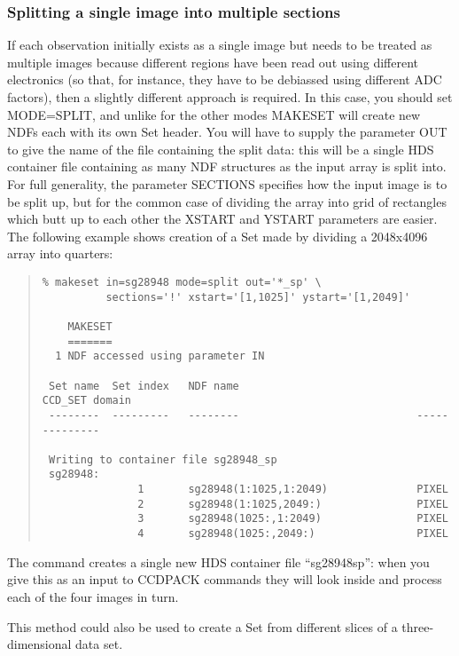 \documentclass[twoside,11pt]{article}
\newcommand{\latexhtml}[2]{#1}
\renewcommand{\_}{\texttt{\symbol{95}}}
\newcommand{\ttsize}{\latexhtml{\small}{}}
\newenvironment{myquote}{\begin{quote}\ttsize}{\end{quote}}
\begin{document}
\subsubsection{\label{makeset_split}Splitting a single image into 
               multiple sections}

If each observation initially exists as a single image 
but needs to be treated as multiple images
because different regions have been read out using different
electronics (so that, for instance, they have to be debiassed using
different ADC factors), then a slightly different approach is required.
In this case, you should set MODE=SPLIT,
and unlike for the other modes MAKESET will create new NDFs each
with its own Set header.  You will have to supply the parameter OUT
to give the name of the file containing the split data:
this will be a single HDS container file containing as many
NDF structures as the input array is split into.
For full generality, the parameter SECTIONS specifies how 
the input image is to be split up, but for the common case of dividing the
array into grid of rectangles which butt up to each other the
XSTART and YSTART parameters are easier.
The following example shows creation of a Set made by dividing 
a 2048x4096 array into quarters:
\begin{myquote}
\begin{verbatim}
% makeset in=sg28948 mode=split out='*_sp' \
          sections='!' xstart='[1,1025]' ystart='[1,2049]'

    MAKESET
    =======
  1 NDF accessed using parameter IN

 Set name  Set index   NDF name                            CCD_SET domain
 --------  ---------   --------                            --------------

 Writing to container file sg28948_sp
 sg28948:
               1       sg28948(1:1025,1:2049)              PIXEL
               2       sg28948(1:1025,2049:)               PIXEL
               3       sg28948(1025:,1:2049)               PIXEL
               4       sg28948(1025:,2049:)                PIXEL
\end{verbatim}
\end{myquote}
The command creates a single new HDS container file ``sg28948\_sp'':
when you give this as an input to CCDPACK commands they will look inside 
and process each of the four images in turn.

This method could also be used to create a Set from different slices
of a three-dimensional data set.
\end{document}
